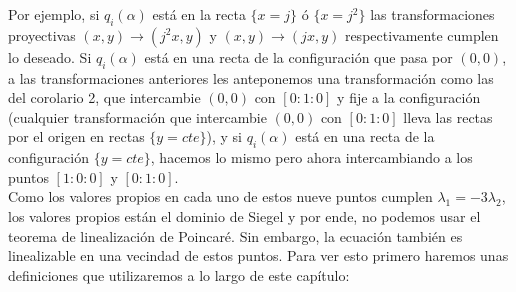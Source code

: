 Por ejemplo, si $q_{i}(\alpha)$ está en la recta $\{ x = j \}$ ó $\{ x = j^{2} \}$ las transformaciones proyectivas $(x,y) \rightarrow (j^{2}x,y)$ y $(x,y) \rightarrow (jx,y)$ respectivamente cumplen lo deseado. Si $q_{i}(\alpha)$ está en una recta de la configuración que pasa por $(0,0)$, a las transformaciones anteriores les anteponemos una transformación como las del corolario 2, que intercambie $(0,0)$ con $[0:1:0]$ y fije a la configuración (cualquier transformación que intercambie $(0,0)$ con $[0:1:0]$ lleva las rectas por el origen en rectas $\{y=cte\}$), y si $q_{i}(\alpha)$ está en una recta de la configuración $\{ y = cte \}$, hacemos lo mismo pero ahora intercambiando a los puntos $[1:0:0]$ y $[0:1:0]$.
\\

Como los valores propios en cada uno de estos nueve puntos cumplen $\lambda_{1} = -3\lambda_{2}$, los valores propios están el dominio de Siegel y por ende, no podemos usar el teorema de linealización de Poincaré. Sin embargo, la ecuación también es linealizable en una vecindad de estos puntos. Para ver esto primero haremos unas definiciones que utilizaremos a lo largo de este capítulo:

